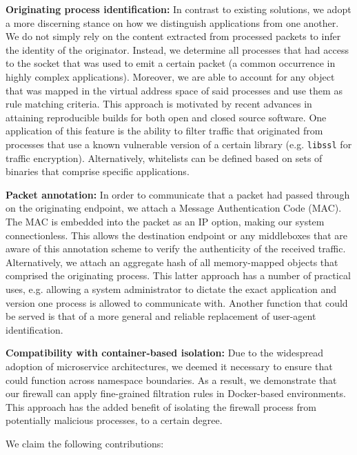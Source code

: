 \textbf{Originating process identification:} In contrast to existing solutions, we adopt a more discerning stance on how we distinguish applications from one another. We do not simply rely on the content extracted from processed packets to infer the identity of the originator. Instead, we determine all processes that had access to the socket that was used to emit a certain packet (a common occurrence in highly complex applications). Moreover, we are able to account for any object that was mapped in the virtual address space of said processes and use them as rule matching criteria. This approach is motivated by recent advances in attaining reproducible builds \cite{butler2023business} for both open and closed source software. One application of this feature is the ability to filter traffic that originated from processes that use a known vulnerable version of a certain library (e.g. \texttt{libssl} for traffic encryption). Alternatively, whitelists can be defined based on sets of binaries that comprise specific applications.

\textbf{Packet annotation:} In order to communicate that a packet had passed through \daf{} on the originating endpoint, we attach a Message Authentication Code (MAC). The MAC is embedded into the packet as an IP option, making our system connectionless. This allows the destination endpoint or any middleboxes that are aware of this annotation scheme to verify the authenticity of the received traffic. Alternatively, we attach an aggregate hash of all memory-mapped objects that comprised the originating process. This latter approach has a number of practical uses, e.g. allowing a system administrator to dictate the exact application and version one process is allowed to communicate with. Another function that could be served is that of a more general and reliable replacement of user-agent identification.

\textbf{Compatibility with container-based isolation:} Due to the widespread adoption of microservice architectures, we deemed it necessary to ensure that \daf{} could function across namespace boundaries. As a result, we demonstrate that our firewall can apply fine-grained filtration rules in Docker-based environments. This approach has the added benefit of isolating the firewall process from potentially malicious processes, to a certain degree.

We claim the following contributions:

